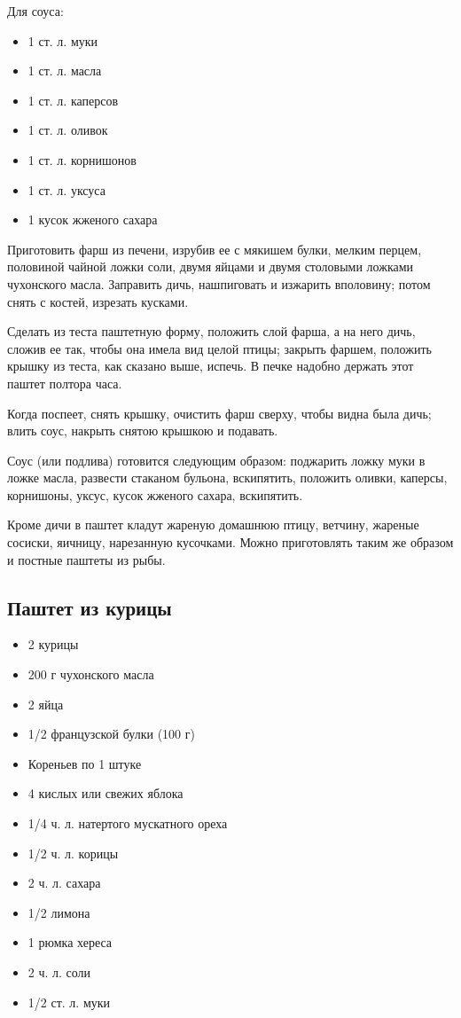 Для соуса: 

\begin{itemize}
	\item 1 ст. л. муки
    \item 1 ст. л. масла 
    \item 1 ст. л. каперсов
    \item 1 ст. л. оливок
    \item 1 ст. л. корнишонов 
    \item 1 ст. л. уксуса 
    \item 1 кусок жженого сахара
\end{itemize}

Приготовить фарш из печени, изрубив ее с мякишем булки, мелким перцем, половиной чайной ложки соли, двумя яйцами и двумя столовыми ложками чухонского масла. Заправить дичь, нашпиговать и изжарить вполовину; потом снять с костей, изрезать кусками.

Сделать из теста паштетную форму, положить слой фарша, а на него дичь, сложив ее так, чтобы она имела вид целой птицы; закрыть фаршем, положить крышку из теста, как сказано выше, испечь. В печке надобно держать этот паштет полтора часа.

Когда поспеет, снять крышку, очистить фарш сверху, чтобы видна была дичь; влить соус, накрыть снятою крышкою и подавать.

Соус (или подлива) готовится следующим образом: поджарить ложку муки в ложке масла, развести стаканом бульона, вскипятить, положить оливки, каперсы, корнишоны, уксус, кусок жженого сахара, вскипятить.

Кроме дичи в паштет кладут жареную домашнюю птицу, ветчину, жареные сосиски, яичницу, нарезанную кусочками. Можно приготовлять таким же образом и постные паштеты из рыбы.

\subsection{Паштет из курицы}

\begin{itemize}
	\item 2 курицы
    \item 200 г чухонского масла
    \item 2 яйца
    \item 1/2 французской булки (100 г)
    \item Кореньев по 1 штуке
    \item 4 кислых или свежих яблока
    \item 1/4 ч. л. натертого мускатного ореха 
    \item 1/2 ч. л. корицы
    \item 2 ч. л. сахара 
    \item 1/2 лимона 
    \item 1 рюмка хереса
    \item 2 ч. л. соли 
    \item 1/2 ст. л. муки
\end{itemize}

